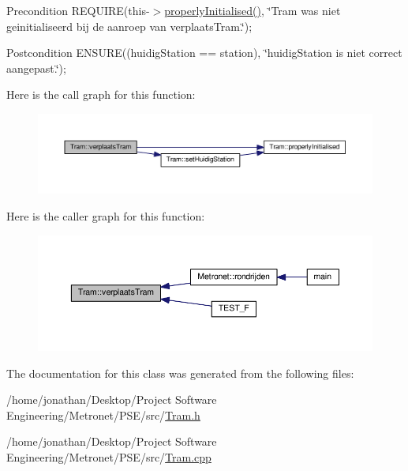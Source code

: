 \begin{DoxyPrecond}{Precondition}
R\+E\+Q\+U\+I\+RE(this-\/$>$\hyperlink{class_tram_a98992eff0453f54fbe64e1f1064169c7}{properly\+Initialised()}, \char`\"{}\+Tram was niet geinitialiseerd bij de aanroep van verplaats\+Tram.\char`\"{}); 
\end{DoxyPrecond}
\begin{DoxyPostcond}{Postcondition}
E\+N\+S\+U\+RE((huidig\+Station == station), \char`\"{}huidig\+Station is niet correct aangepast.\char`\"{}); 
\end{DoxyPostcond}


Here is the call graph for this function\+:
\nopagebreak
\begin{figure}[H]
\begin{center}
\leavevmode
\includegraphics[width=350pt]{class_tram_a8d55296c7ede4aa92c9b3a4b2a9495a8_cgraph}
\end{center}
\end{figure}




Here is the caller graph for this function\+:\nopagebreak
\begin{figure}[H]
\begin{center}
\leavevmode
\includegraphics[width=350pt]{class_tram_a8d55296c7ede4aa92c9b3a4b2a9495a8_icgraph}
\end{center}
\end{figure}




The documentation for this class was generated from the following files\+:\begin{DoxyCompactItemize}
\item 
/home/jonathan/\+Desktop/\+Project Software Engineering/\+Metronet/\+P\+S\+E/src/\hyperlink{_tram_8h}{Tram.\+h}\item 
/home/jonathan/\+Desktop/\+Project Software Engineering/\+Metronet/\+P\+S\+E/src/\hyperlink{_tram_8cpp}{Tram.\+cpp}\end{DoxyCompactItemize}
